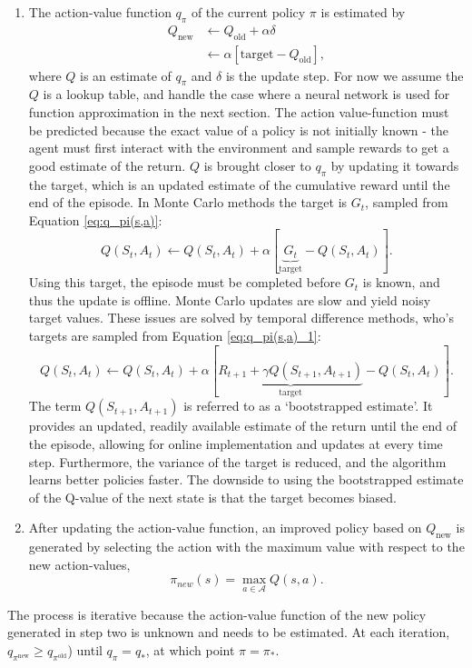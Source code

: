 \begin{enumerate}
    \item The action-value function $q_\pi$ of the current policy $\pi$ is estimated by
    \begin{equation}
    \begin{split}
    Q_{\text{new}} & \leftarrow Q_{\text{old}} + \alpha \delta \\
    & \leftarrow \alpha [\text{target} - Q_{\text{old}}],
    \label{eq:Q_update}
    \end{split} 
    \end{equation}
    where $Q$ is an estimate of $q_\pi$ and $\delta$ is the update step. For now we assume the $Q$ is a lookup table, and handle the case where a neural network is used for function approximation in the next section.
    The action value-function must be predicted because the exact value of a policy is not initially known - the agent must first interact with the environment and sample rewards to get a good estimate of the return. 
    $Q$ is brought closer to $q_\pi$ by updating it towards the target, which is an updated estimate of the cumulative reward until the end of the episode. In Monte Carlo methods the target is $G_t$, sampled from Equation \ref{eq:q_pi(s,a)}:
    \begin{equation}
        Q(S_t, A_t) \leftarrow Q(S_t, A_t) + \alpha [\underbrace{G_t}_{\text{target}} - Q(S_{t}, A_{t})].
    \label{eq:monte_carlo_update}
    \end{equation}
    Using this target, the episode must be completed before $G_t$ is known, and thus the update is offline. Monte Carlo updates are slow and yield noisy target values. These issues are solved by temporal difference methods, who's targets are sampled from Equation \ref{eq:q_pi(s,a)_1}:
    \begin{equation}
        Q(S_t, A_t) \leftarrow Q(S_t, A_t) + \alpha [\underbrace{R_{t+1} + \gamma Q(S_{t+1}, A_{t+1})}_{\text{target}} - Q(S_{t}, A_{t})].
    \label{eq:td_update}
    \end{equation}
    The term $Q(S_{t+1}, A_{t+1})$ is referred to as a `bootstrapped estimate'. It provides an updated, readily available estimate of the return until the end of the episode, allowing for online implementation and updates at every time step. Furthermore, the variance of the target is reduced, and the algorithm learns better policies faster.
    The downside to using the bootstrapped estimate of the Q-value of the next state is that the target becomes biased. 
    \item After updating the action-value function, an improved policy based on $Q_{\text{new}}$ is generated by selecting the action with the maximum value with respect to the new action-values, 
    \begin{equation}
    \pi_{new}(s) = \max_{a \in \mathcal{A}} Q(s,a).
    \label{eq:new_greedy_policy}
    \end{equation}
\end{enumerate}
The process is iterative because the action-value function of the new policy generated in step two is unknown and needs to be estimated.
At each iteration,  $q_{\pi^{\text{new}}} \geq q_{\pi^{\text{old}}}$) until $q_\pi = q_*$, at which point $\pi = \pi_*$.

